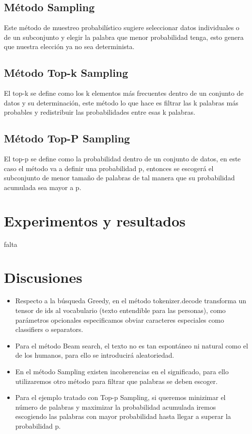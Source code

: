 \documentclass[10pt,twocolumn]{article}
\theoremstyle{definition}
\begin{document}
\subsection{Método Sampling}
Este método de muestreo probabilístico sugiere seleccionar datos individuales o de un subconjunto y elegir la palabra que menor probabilidad tenga, esto genera que nuestra elección ya no sea determinista.

\subsection{Método Top-k Sampling}
El top-k se define como los k elementos más frecuentes dentro de un conjunto de datos y su determinación, este método lo que hace es filtrar las  k palabras más probables y redistribuir las probabilidades entre esas k palabras.

\subsection{Método Top-P Sampling}
El top-p se define como la probabilidad dentro de un conjunto de datos, en este caso el método va a definir una probabilidad p, entonces se escogerá el subconjunto de menor tamaño de palabras de tal manera que su probabilidad acumulada sea mayor a p.

\section{Experimentos y resultados}
falta

\section{Discusiones}
\begin{itemize}
    \item Respecto a la búsqueda Greedy, en el método tokenizer.decode transforma un tensor de ids al vocabulario (texto entendible para las personas), como parámetros opcionales especificamos obviar caracteres especiales como classifiers o separators.
    \item Para el método Beam search, el texto no es tan espontáneo ni natural como el de los humanos, para ello se introducirá aleatoriedad.
    \item En el método Sampling existen incoherencias en el significado, para ello utilizaremos otro método para filtrar que palabras se deben escoger.  
    \item Para el ejemplo tratado con Top-p Sampling, si queremos minizimar el número de palabras y maximizar la probabilidad acumulada iremos escogiendo las palabras con mayor probabilidad hasta llegar a superar la probabilidad p.
    
\end{itemize}
\end{document}
